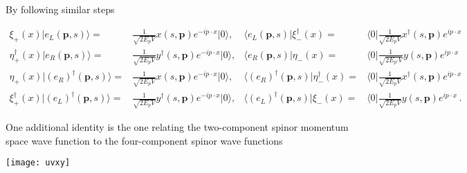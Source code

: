 By following similar steps
\begin{frame}
  \begin{align}
 \xi_+(x)|e_{L}(\mathbf{p},s)\rangle=&\frac{1}{\sqrt{2 E_p V}}x(s,\mathbf{p})e^{-i p\cdot x}|0\rangle,&
  \langle e_{L}(\mathbf{p},s)|\xi_-^{\dagger}(x)=&\langle 0|\frac{1}{\sqrt{2 E_p V}}x^{\dagger}(s,\mathbf{p})e^{i p\cdot x}\nonumber\\
  \eta_+^{\dagger}(x)|e_R (\mathbf{p},s)\rangle=&\frac{1}{\sqrt{2 E_{p} V}}y^{\dagger}(s,\mathbf{p})e^{-i p\cdot x}|0\rangle,&
  \langle e_R(\mathbf{p},s)|\eta_-(x)=&\langle 0|\frac{1}{\sqrt{2 E_{p'} V}}y(s,\mathbf{p})e^{i p\cdot x} \nonumber\\
  \eta_+(x)|\left( e_R \right)^{\dagger}(\mathbf{p},s)\rangle=&\frac{1}{\sqrt{2 E_{p} V}}x(s,\mathbf{p})e^{-i p\cdot x}|0\rangle,&
  \langle \left( e_R \right)^{\dagger}(\mathbf{p},s)|\eta^{\dagger}_-(x)=&\langle 0|\frac{1}{\sqrt{2 E_{p} V}}x^{\dagger}(s,\mathbf{p})e^{i p\cdot x} \nonumber\\
  \xi_+^{\dagger}(x)|\left( e_{L} \right)^{\dagger}(\mathbf{p},s)\rangle=&\frac{1}{\sqrt{2 E_p V}}y^{\dagger}(s,\mathbf{p})e^{-i p\cdot x}|0\rangle,&
  \langle\left( e_{L} \right)^{\dagger}(\mathbf{p},s)|\xi_-(x)=&\langle 0| \frac{1}{\sqrt{2 E_p V}}y(s,\mathbf{p})e^{i p\cdot x}
 \,.
\end{align}  
\end{frame}

\begin{frame}
One additional identity is the one relating the two-component spinor momentum space wave function to the four-component spinor wave functions

\texttt{[image: uvxy]}
\end{frame}











